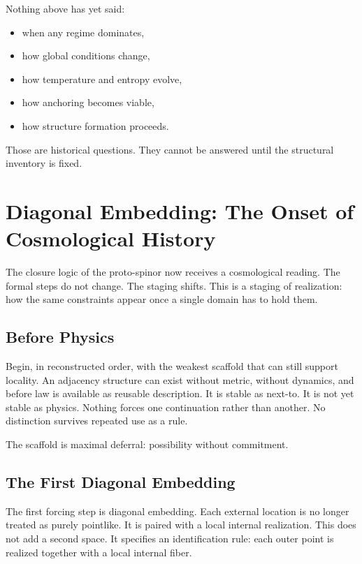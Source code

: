 \documentclass[11pt,twoside,openright]{book}
\begin{document}
Nothing above has yet said:

\begin{itemize}
\item when any regime dominates,
\item how global conditions change,
\item how temperature and entropy evolve,
\item how anchoring becomes viable,
\item how structure formation proceeds.
\end{itemize}

Those are historical questions. They cannot be answered until the structural inventory is fixed.

\chapter{Diagonal Embedding: The Onset of Cosmological History}

The closure logic of the proto-spinor now receives a cosmological reading. The formal steps do not change. The staging shifts. This is a staging of realization: how the same constraints appear once a single domain has to hold them.

\section*{Before Physics}

Begin, in reconstructed order, with the weakest scaffold that can still support locality. An adjacency structure can exist without metric, without dynamics, and before law is available as reusable description. It is stable as next-to. It is not yet stable as physics. Nothing forces one continuation rather than another. No distinction survives repeated use as a rule.

The scaffold is maximal deferral: possibility without commitment.

\section*{The First Diagonal Embedding}

The first forcing step is diagonal embedding. Each external location is no longer treated as purely pointlike. It is paired with a local internal realization. This does not add a second space. It specifies an identification rule: each outer point is realized together with a local internal fiber.
\end{document}
